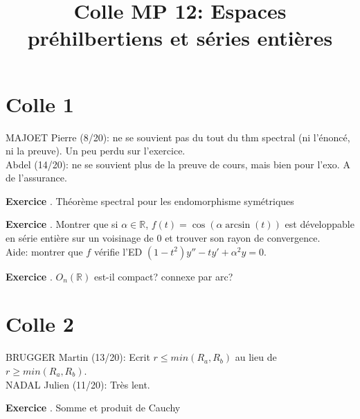 \documentclass[10pt,a4paper]{article}
\title{Colle MP 12: Espaces préhilbertiens et séries entières}
\newcounter{question}
\newcounter{exo}
\newenvironment{exo}{\vspace{0.5cm}\setcounter{question}{0}\addtocounter{exo}{1} \noindent \textbf{Exercice \theexo}. \normalsize }{\par}
\begin{document}
	\maketitle
	
	\section*{Colle 1}
	MAJOET Pierre (8/20): ne se souvient pas du tout du thm spectral (ni l'énoncé, ni la preuve). Un peu perdu sur l'exercice.\\
	Abdel (14/20): ne se souvient plus de la preuve de cours, mais bien pour l'exo. A de l'assurance.
	
	\begin{exo}
		Théorème spectral pour les endomorphisme symétriques
	\end{exo}
%

	\begin{exo}
		Montrer que si $\alpha \in \mathbb{R}$, $f(t) =\cos(\alpha \arcsin(t))$ est développable en série entière sur un voisinage de 0 et trouver son rayon de convergence.\\
		Aide: montrer que $f$ vérifie l'ED $(1 - t^2) y'' - t y' + \alpha^2 y = 0$.
	\end{exo}
			
	\begin{exo}
		$O_n(\mathbb{R})$ est-il compact? connexe par arc?
	\end{exo}
	
	\section*{Colle 2}
	\setcounter{exo}{0}
	BRUGGER Martin (13/20): Ecrit $r \leq min(R_a, R_b)$ au lieu de $r \geq min(R_a, R_b)$.\\
	NADAL Julien (11/20): Très lent.\\
	
	\begin{exo}
		Somme et produit de Cauchy
	\end{exo}
\end{document}
